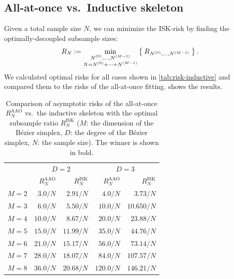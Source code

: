 \documentclass[letterpaper]{article} %
\theoremstyle{plain}
\begin{document}
\subsection{All-at-once vs.\ Inductive skeleton}\label{sec:all-vs-inductive}
Given a total sample size $N$, we can minimize the ISK-risk by finding the optimally-decoupled subsample sizes:
\begin{equation}
    R_N := \min_{
    \substack{N^{(0)}, \dots, N^{(M - 1)}
    \\
    N = N^{(0)} + \dots + N^{(M - 1)}
    }} \Set{R_{N^{(0)}, \dots, N^{(M - 1)}}} .
\end{equation}
We calculated optimal risks for all cases shown in \cref{tab:risk-inductive} and compared them to the risks of the all-at-once fitting.
 shows the results.
\begin{table}[H]
    \small
    \centering
    \caption{Comparison of asymptotic risks of the all-at-once $R_N^\mathrm{AAO}$ vs.\ the inductive skeleton with the optimal subsample ratio $R_N^\mathrm{ISK}$ ($M$: the dimension of the B\'ezier simplex, $D$: the degree of the B\'ezier simplex, $N$: the sample size). The winner is shown in bold.}\label{tab:risk-comparison}
    \begin{tabular}{l|rr|rr}
    \toprule
    & \multicolumn{2}{c|}{$D = 2$} & \multicolumn{2}{c}{$D = 3$} \\
    & $R_{N}^\mathrm{AAO}$ & $R_N^\mathrm{ISK}$
    & $R_{N}^\mathrm{AAO}$ & $R_N^\mathrm{ISK}$
    \\
    \midrule
    $M = 2$ &
    $3.0 / N$ &
    $\bm{2.91} / N$ &
    $4.0 / N$ &
    $\bm{3.73} / N$
    \\
    $M = 3$ &
    $6.0 / N$ &
    $\bm{5.50} / N$ &
    $\bm{10.0} / N$ &
    $10.650 / N$
    \\
    $M = 4$ &
    $10.0 / N$ &
    $\bm{8.67} / N$ &
    $\bm{20.0} / N$ &
    $23.88 / N$
    \\
    $M = 5$ &
    $15.0 / N$ &
    $\bm{11.99} / N$ &
    $\bm{35.0} / N$ &
    $44.76 / N$
    \\
    $M = 6$ &
    $21.0 / N$ &
    $\bm{15.17} / N$ &
    $\bm{56.0} / N$ &
    $73.14 / N$
    \\
    $M = 7$ &
    $28.0 / N$ &
    $\bm{18.07} / N$ &
    $\bm{84.0} / N$ &
    $107.57 / N$
    \\
    $M = 8$ &
    $36.0 / N$ &
    $\bm{20.68} / N$ &
    $\bm{120.0} / N$ &
    $146.21 / N$
    \\
    \bottomrule
    \end{tabular}
\end{table}
\end{document}
